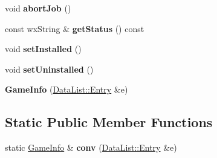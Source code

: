 \begin{DoxyCompactItemize}
\item 
\hypertarget{struct_game_info_ab215e599c4d10634db667bb128012170}{void {\bfseries abort\-Job} ()}\label{struct_game_info_ab215e599c4d10634db667bb128012170}

\item 
\hypertarget{struct_game_info_af4fe6666fb744e716b4953b2e83a2d5c}{const wx\-String \& {\bfseries get\-Status} () const }\label{struct_game_info_af4fe6666fb744e716b4953b2e83a2d5c}

\item 
\hypertarget{struct_game_info_aeb4267b9235b836bd748a4dcfedab075}{void {\bfseries set\-Installed} ()}\label{struct_game_info_aeb4267b9235b836bd748a4dcfedab075}

\item 
\hypertarget{struct_game_info_af5ebf3dd171e83709cc6072b1200d5f7}{void {\bfseries set\-Uninstalled} ()}\label{struct_game_info_af5ebf3dd171e83709cc6072b1200d5f7}

\item 
\hypertarget{struct_game_info_a9010b4758082c1f904224505f3efcecb}{{\bfseries Game\-Info} (\hyperlink{struct_data_list_1_1_entry}{Data\-List\-::\-Entry} \&e)}\label{struct_game_info_a9010b4758082c1f904224505f3efcecb}

\end{DoxyCompactItemize}
\subsection*{Static Public Member Functions}
\begin{DoxyCompactItemize}
\item 
\hypertarget{struct_game_info_a611d2e932e53685c0acf0692839d9d0d}{static \hyperlink{struct_game_info}{Game\-Info} \& {\bfseries conv} (\hyperlink{struct_data_list_1_1_entry}{Data\-List\-::\-Entry} \&e)}\label{struct_game_info_a611d2e932e53685c0acf0692839d9d0d}

\end{DoxyCompactItemize}
